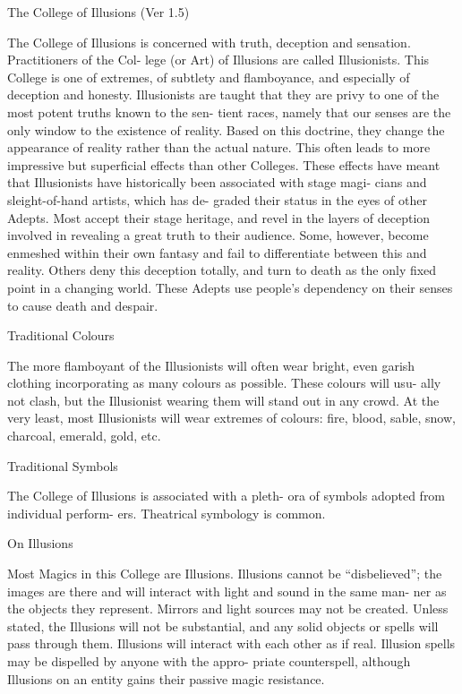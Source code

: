 \begin{Chapter}{The College of Illusions (Ver 1.5)}

The  College  of  Illusions  is  concerned  with  truth, 
deception  and  sensation.  Practitioners  of  the  Col-
lege  (or  Art)  of  Illusions  are  called  Illusionists. 
This  College  is  one  of  extremes,  of  subtlety  and 
flamboyance,  and  especially  of  deception  and 
honesty.  Illusionists  are  taught  that  they  are  privy 
to one of the most potent truths known to the sen-
tient  races,  namely  that  our  senses  are  the  only 
window  to  the  existence  of  reality.  Based  on  this 
doctrine,  they  change  the  appearance  of  reality 
rather  than  the  actual  nature.  This  often  leads  to 
more  impressive  but  superficial  effects  than  other 
Colleges. These effects have meant that Illusionists 
have  historically  been  associated  with  stage  magi-
cians  and  sleight-of-hand  artists,  which  has  de-
graded  their  status  in  the  eyes  of  other  Adepts. 
Most  accept  their  stage  heritage,  and  revel  in  the 
layers  of  deception  involved  in  revealing  a  great 
truth  to  their  audience.  Some,  however,  become 
enmeshed  within  their  own  fantasy  and  fail  to 
differentiate  between  this  and  reality.  Others  deny 
this deception totally, and turn to death as the only 
fixed point in a changing world. These Adepts use 
people’s dependency on their senses to cause death 
and despair. 

Traditional Colours 

The  more  flamboyant  of  the  Illusionists  will  often 
wear  bright,  even  garish  clothing  incorporating  as 
many  colours  as  possible.  These  colours  will  usu-
ally not clash, but the Illusionist wearing them will 
stand  out  in  any  crowd.  At  the  very  least,  most 
Illusionists  will  wear  extremes  of  colours:  fire, 
blood, sable, snow, charcoal, emerald, gold, etc. 

Traditional Symbols 

The College of Illusions is associated with a pleth-
ora  of  symbols  adopted  from  individual  perform-
ers. Theatrical symbology is common. 

On Illusions 

Most Magics in this College are Illusions. Illusions 
cannot  be  “disbelieved”;  the  images  are  there  and 
will interact with light and sound in the same man-
ner as the objects they represent. Mirrors and light 
sources  may  not  be  created.  Unless  stated,  the 
Illusions  will  not  be  substantial,  and  any  solid 
objects  or  spells  will  pass  through  them.  Illusions 
will  interact  with  each  other  as  if  real.  Illusion 
spells may be dispelled by anyone  with the appro-
priate  counterspell,  although  Illusions  on  an  entity 
gains their passive magic resistance. 


\end{Chapter}

